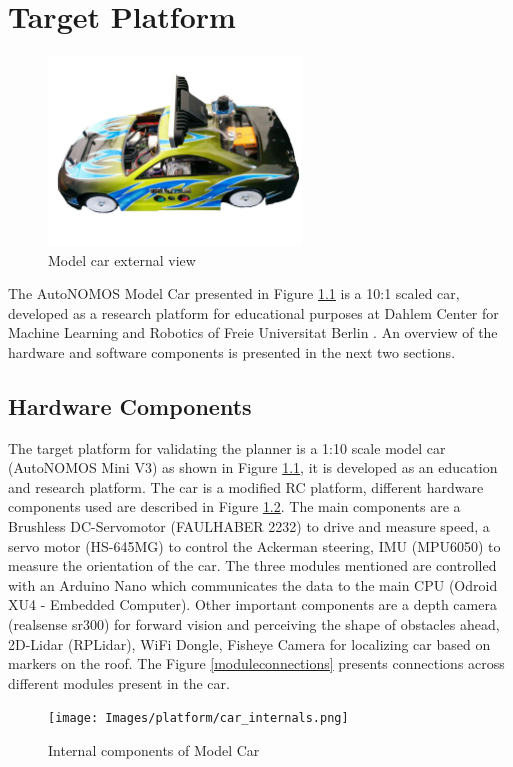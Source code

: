 \chapter{Target Platform}
\label{vehicle_info}

\begin{figure}[H]
	\centering
	\includegraphics[width=0.6\textwidth]{Images/platform/car.jpg}
	\caption{Model car external view}
	\label{model_car}
\end{figure}


The AutoNOMOS Model Car presented in Figure \ref{model_car} is a 10:1 scaled car, developed as a research platform for educational purposes at Dahlem Center for Machine Learning and Robotics of Freie Universitat Berlin \cite{dcmlr}. An overview of the hardware and software components is presented in the next two sections. 

\section{Hardware Components}
The target platform for validating the planner is a 1:10 scale model car (AutoNOMOS Mini V3) as shown in Figure \ref{model_car}, it is developed as an education and research platform. The car is a modified RC platform, different hardware components used are described in Figure \ref{internalcar}. The main components are a Brushless DC-Servomotor (FAULHABER 2232) to drive and measure speed, a servo motor (HS-645MG) to control the Ackerman steering, IMU (MPU6050) to measure the orientation of the car. The three modules mentioned are controlled with an Arduino Nano which communicates the data to the main CPU (Odroid XU4 - Embedded Computer). Other important components are a depth camera (realsense sr300) for forward vision and perceiving the shape of obstacles ahead, 2D-Lidar (RPLidar), WiFi Dongle, Fisheye Camera for localizing car based on markers on the roof. The Figure \ref{moduleconnections} presents connections across different modules present in the car.
\begin{figure}
	\centering
	\texttt{[image: Images/platform/car\_internals.png]}
	\caption{Internal components of Model Car \cite{model_car_archi}}
	\label{internalcar}
\end{figure}

